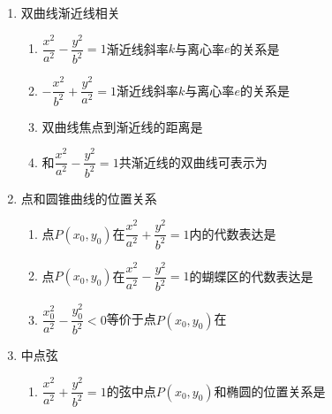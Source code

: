 \begin{enumerate}
\begin{enumerate}
        \item $-\dfrac{x^2}{b^2}+\dfrac{y^2}{a^2} = 1$上所在直线倾斜角为$\alpha$的焦点弦长为，对应的两个焦半径分别为和
        \item $y^2 = 2px(p>0)$上所在直线倾斜角为$\alpha$的焦点弦长为，对应的两个焦半径分别为和
        \item $x^2 = 2py(p>0)$上所在直线倾斜角为$\alpha$的焦点弦长为，对应的两个焦半径分别为和
    \end{enumerate}
    \item 双曲线渐近线相关
    \begin{enumerate}
        \item $\dfrac{x^2}{a^2}-\dfrac{y^2}{b^2} = 1$渐近线斜率$k$与离心率$e$的关系是
        \item $-\dfrac{x^2}{b^2}+\dfrac{y^2}{a^2} = 1$渐近线斜率$k$与离心率$e$的关系是
        \item 双曲线焦点到渐近线的距离是
        \item 和$\dfrac{x^2}{a^2}-\dfrac{y^2}{b^2} = 1$共渐近线的双曲线可表示为
    \end{enumerate}
    \item 点和圆锥曲线的位置关系
    \begin{enumerate}
        \item 点$P(x_0, y_0)$在$\dfrac{x^2}{a^2}+\dfrac{y^2}{b^2} = 1$内的代数表达是
        \item 点$P(x_0, y_0)$在$\dfrac{x^2}{a^2}-\dfrac{y^2}{b^2} = 1$的蝴蝶区的代数表达是
        \item $\dfrac{x_0^2}{a^2}-\dfrac{y_0^2}{b^2} < 0$等价于点$P(x_0, y_0)$在
    \end{enumerate}
    \item 中点弦
    \begin{enumerate}
        \item $\dfrac{x^2}{a^2}+\dfrac{y^2}{b^2} = 1$的弦中点$P(x_0, y_0)$和椭圆的位置关系是

\end{enumerate}
\end{enumerate}
